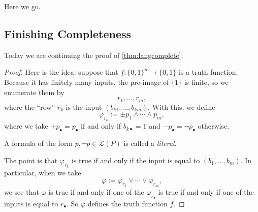 
Here we go.

\subsection{Finishing Completeness}

Today we are continuing the proof of \autoref{thm:langcomplete}.
\langcomplete*
\begin{proof}
	Here is the idea: suppose that $f:\{0,1\}^n\to\{0,1\}$ is a truth function. Because it has finitely many inputs, the pre-image of $\{1\}$ is finite, so we enumerate them by
	\[r_1,\ldots,r_m,\]
	where the ``row'' $r_k$ is the input $(b_{k1},\ldots,b_{km})$. With this, we define
	\[\varphi_{r_k}:=\pm p_1\land\cdots\land p_m,\]
	where we take $+p_\bullet=p_\bullet$ if and only if $b_{k\bullet}=1$ and $-p_\bullet=\lnot p_\bullet$ otherwise.
	\begin{definition}[Literal]
		A formula of the form $p,\lnot p\in\mathcal L(P)$ is called a \textit{literal}.
	\end{definition}
	The point is that $\varphi_{r_k}$ is true if and only if the input is equal to $(b_1,\ldots,b_m)$. In particular, when we take
	\[\varphi:=\varphi_{r_1}\lor\cdots\lor\varphi_{r_m},\]
	we see that $\varphi$ is true if and only if one of the $\varphi_{r_\bullet}$ is true if and only if one of the inputs is equal to $r_\bullet$. So $\varphi$ defines the truth function $f$.
\end{proof}

